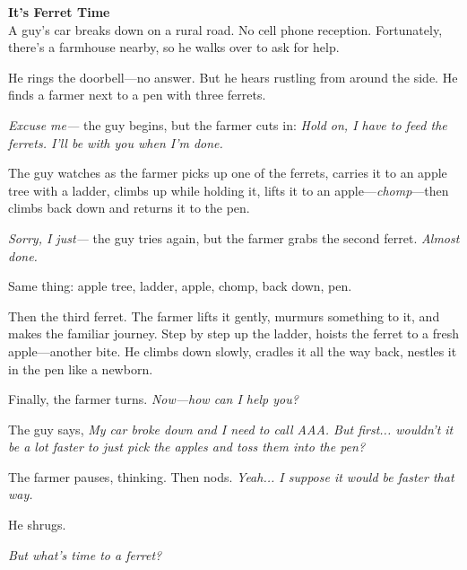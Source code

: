 \begin{tcolorbox}[
    enhanced,
    colback=lightpeach,
    colframe=gray!50,
    boxrule=0.5pt,
    arc=2mm,
    left=12pt,
    right=12pt,
    top=10pt,
    bottom=10pt
]

\noindent\textbf{It's Ferret Time}\\[0.1em]
\medskip
A guy's car breaks down on a rural road. No cell phone reception. Fortunately, there's a farmhouse nearby, so he walks over to ask for help.

He rings the doorbell—no answer. But he hears rustling from around the side. He finds a farmer next to a pen with three ferrets.

\smallskip
\noindent\textit{\QSOpen{}Excuse me—\QSClose{}} the guy begins, but the farmer cuts in: \textit{\QSOpen{}Hold on, I have to feed the ferrets. I'll be with you when I'm done.\QSClose{}}

\smallskip
The guy watches as the farmer picks up one of the ferrets, carries it to an apple tree with a ladder, climbs up while holding it, lifts it to an apple—\textit{chomp}—then climbs back down and returns it to the pen.

\smallskip
\noindent\textit{\QSOpen{}Sorry, I just—\QSClose{}} the guy tries again, but the farmer grabs the second ferret. \textit{\QSOpen{}Almost done.\QSClose{}}

\noindent Same thing: apple tree, ladder, apple, chomp, back down, pen.

\smallskip
Then the third ferret. The farmer lifts it gently, murmurs something to it, and makes the familiar journey. Step by step up the ladder, hoists the ferret to a fresh apple—another bite. He climbs down slowly, cradles it all the way back, nestles it in the pen like a newborn.

\smallskip
Finally, the farmer turns. \textit{\QSOpen{}Now—how can I help you?\QSClose{}}

\smallskip
The guy says, \textit{\QSOpen{}My car broke down and I need to call AAA. But first... wouldn't it be a lot faster to just pick the apples and toss them into the pen?\QSClose{}}

\smallskip
The farmer pauses, thinking. Then nods. \textit{\QSOpen{}Yeah... I suppose it would be faster that way.\QSClose{}}

\smallskip
He shrugs.

\smallskip
\textit{\QSOpen{}But what's time to a ferret?\QSClose{}}

\end{tcolorbox}

\vspace*{\fill}
